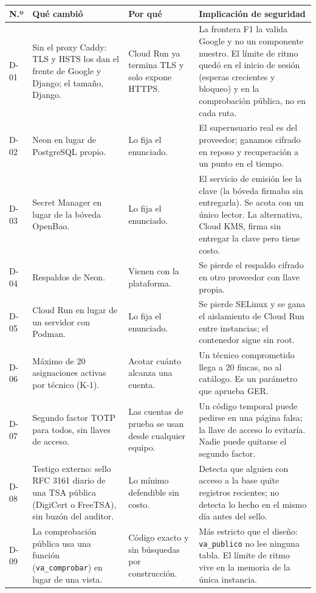\documentclass[11pt,letterpaper]{article}
\newcommand{\cab}[1]{\textbf{\rmfamily #1}}
\newcommand{\cod}[1]{\texttt{\small #1}}
\begin{document}
\begin{center}
\footnotesize
\renewcommand{\arraystretch}{1.12}
\begin{longtable}{@{}L{0.8cm} L{4.2cm} L{4.6cm} p{5.0cm}@{}}
\toprule
\cab{N.º} & \cab{Qué cambió} & \cab{Por qué} & \cab{Implicación de seguridad} \\
\midrule
\endhead
D-01 & Sin el proxy Caddy: TLS y HSTS los dan el frente de Google y Django; el tamaño, Django. & Cloud Run ya termina TLS y solo expone HTTPS. & La frontera F1 la valida Google y no un componente nuestro. El límite de ritmo quedó en el inicio de sesión (esperas crecientes y bloqueo) y en la comprobación pública, no en cada ruta. \\
D-02 & Neon en lugar de PostgreSQL propio. & Lo fija el enunciado. & El superusuario real es del proveedor; ganamos cifrado en reposo y recuperación a un punto en el tiempo. \\
D-03 & Secret Manager en lugar de la bóveda OpenBao. & Lo fija el enunciado. & El servicio de emisión lee la clave (la bóveda firmaba sin entregarla). Se acota con un único lector. La alternativa, Cloud KMS, firma sin entregar la clave pero tiene costo. \\
D-04 & Respaldos de Neon. & Vienen con la plataforma. & Se pierde el respaldo cifrado en otro proveedor con llave propia. \\
D-05 & Cloud Run en lugar de un servidor con Podman. & Lo fija el enunciado. & Se pierde SELinux y se gana el aislamiento de Cloud Run entre instancias; el contenedor sigue sin root. \\
D-06 & Máximo de 20 asignaciones activas por técnico (K-1). & Acotar cuánto alcanza una cuenta. & Un técnico comprometido llega a 20 fincas, no al catálogo. Es un parámetro que aprueba GER. \\
D-07 & Segundo factor TOTP para todos, sin llaves de acceso. & Las cuentas de prueba se usan desde cualquier equipo. & Un código temporal puede pedirse en una página falsa; la llave de acceso lo evitaría. Nadie puede quitarse el segundo factor. \\
D-08 & Testigo externo: sello RFC 3161 diario de una TSA pública (DigiCert o FreeTSA), sin buzón del auditor. & Lo mínimo defendible sin costo. & Detecta que alguien con acceso a la base quite registros recientes; no detecta lo hecho en el mismo día antes del sello. \\
D-09 & La comprobación pública usa una función (\cod{va\_comprobar}) en lugar de una vista. & Código exacto y sin búsquedas por construcción. & Más estricto que el diseño: \cod{va\_publico} no lee ninguna tabla. El límite de ritmo vive en la memoria de la única instancia. \\

\end{longtable}
\end{center}
\end{document}
